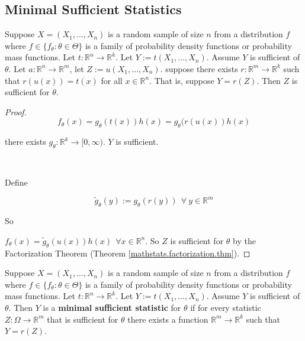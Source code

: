 \subsection{Minimal Sufficient Statistics}

\begin{proposition}

Suppose \(X = (X_1, \ldots, X_n)\) is a random sample of size \(n\) from a distribution \(f\) where \(f \in \{f_\theta: \theta \in \Theta \}\) is a family of probability density functions or probability mass functions. Let \(t: \mathbb{R}^n \to \mathbb{R}^k\). Let \(Y:= t(X_1, \ldots, X_n)\). Assume \(Y\) is sufficient of \(\theta\). Let \(a: \mathbb{R}^n \to \mathbb{R}^m\), let \(Z:=u(X_1, \ldots, X_n)\). suppose there exists \(r: \mathbb{R}^m \to \mathbb{R}^k\) such that \(r(u(x)) = t(x)\) for all \(x \in \mathbb{R}^n\). That is, suppose \(Y = r(Z)\). Then \(Z\) is sufficient for \(\theta\).

\end{proposition}

\begin{proof}

\[
f_\theta(x) = g_\theta(t(x)) h(x) = g_\theta(r(u(x)) h(x)
\]


there exists \(g_\theta: \mathbb{R}^k \to [0, \infty)\). \(Y\) is sufficient.

\

Define 

\[
\tilde{g}_\theta(y) := g_\theta(r(y)) \ \ \forall \ y \in \mathbb{R}^m
\]

So

\(f_\theta(x) = \tilde{g}_\theta(u(x)) h(x) \ \ \forall x \in \mathbb{R}^n\). So \(Z\) is sufficient for \(\theta\) by the Factorization Theorem (Theorem \ref{mathstats.factorization.thm}).

\end{proof}

\begin{definition} Suppose \(X = (X_1, \ldots, X_n)\) is a random sample of size \(n\) from a distribution \(f\) where \(f \in \{f_\theta: \theta \in \Theta \}\) is a family of probability density functions or probability mass functions. Let \(t: \mathbb{R}^n \to \mathbb{R}^k\). Let \(Y:= t(X_1, \ldots, X_n)\). Assume \(Y\) is sufficient of \(\theta\). Then \(Y\) is a \textbf{minimal sufficient statistic} for \(\theta\) if for every statistic \(Z: \Omega \to \mathbb{R}^m\) that is sufficient for \(\theta\) there exists a function \(\mathbb{R}^m \to \mathbb{R}^k\) such that \(Y = r(Z)\).

\end{definition}

